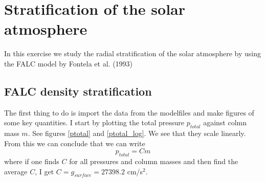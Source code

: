 \documentclass{aa}   %
\begin{document}
  


\section{Stratification of the solar atmosphere}
In this exercise we study the radial stratification of the solar atmosphere by using the FALC model by Fontela et al. (1993)

\subsection{FALC density stratification}
The first thing to do is import the data from the modelfiles and make figures of some key quantities.
I start by plotting the total pressure $p_{total}$ against colmn mass $m$. See figures \ref{ptotal} and \ref{ptotal_log}.
We see that they scale linearly. From this we can conclude that we can write 
\begin{equation}
 p_{total} = Cm
\end{equation}
where if one finds $C$ for all pressures and column masses and then find the average $C$, I get $C = g_{surface} = 27398.2$ cm/s$^2$.

\end{document}
